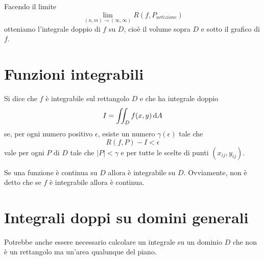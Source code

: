 Facendo il limite
$$\lim_{(n,m) \to (\infty, \infty)} R(f,P_{artizione})$$ otteniamo l'integrale doppio di $f$ su $D$, cioè il volume sopra $D$ e sotto il grafico di $f$.


\section{Funzioni integrabili}

\begin{definition}
Si dice che $f$ è integrabile sul rettangolo $D$ e che ha integrale doppio $$I = \iint_D f(x,y) \mathop{}\!\mathrm{d} A$$
se, per ogni numero positivo $\epsilon$, esiste un numero $\gamma(\epsilon)$ tale  che $$R(f,P)-I<\epsilon$$ vale per ogni $P$ di $D$ tale che $|P|<\gamma$ e per tutte le scelte di punti $(x_{ij},y_{ij})$.
\end{definition}

\begin{property}
Se una funzione è continua su $D$ allora è integrabile su $D$. Ovviamente, non è detto che se $f$ è integrabile allora è continua.
\end{property}

\section{Integrali doppi su domini generali}

Potrebbe anche essere necessario calcolare un integrale su un dominio $D$ che non è un rettangolo ma un'area qualunque del piano.
